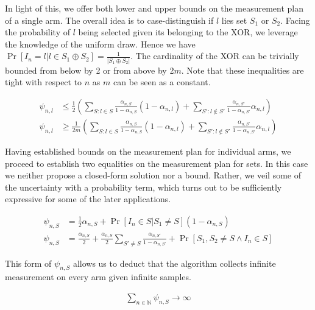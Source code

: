In light of this, we offer both lower and upper bounds on the measurement plan of
a single arm. The overall idea is to case-distinguish if $l$ lies set $S_1$ or
$S_2$. Facing the probability of $l$ being selected given its belonging to the
XOR, we leverage the knowledge of the uniform draw. Hence we have $\Pr[I_n = l|l
\in S_1 \oplus S_2] = \frac{1}{|S_1 \oplus S_2|}$. The cardinality of the XOR
can be trivially bounded from below by 2 or from above by 2$m$. Note that these
inequalities are tight with respect to $n$ as $m$ can be seen as a constant.
\begin{proposition}\label{proposition:measurement_plan_arm}
  \begin{align}
    \psi_{n, l} &\leq \frac{1}{2}(\sum_{S: l \in S} \frac{\alpha_{n, S}}{1 -
        \alpha_{n, S}} (1 - \alpha_{n, l}) +  \sum_{S': l \notin S'}
        \frac{\alpha_{n, S'}}{1 - \alpha_{n, S'}} \alpha_{n, l}) \\
    \psi_{n, l} &\geq \frac{1}{2m}(\sum_{S: l \in S} \frac{\alpha_{n, S}}{1 -
        \alpha_{n, S}} (1 - \alpha_{n, l}) +  \sum_{S': l \notin S'}
        \frac{\alpha_{n, S'}}{1 - \alpha_{n, S'}} \alpha_{n, l})
  \end{align}
\end{proposition}
Having established bounds on the measurement plan for individual arms, we
proceed to establish two equalities on the measurement plan for sets. In this
case we neither propose a closed-form solution nor a bound. Rather, we veil some
of the uncertainty with a probability term, which turns out to be sufficiently
expressive for some of the later applications.
\begin{proposition}\label{proposition:measurement_pan_set}
  \begin{align}
    \psi_{n, S} &= \frac{1}{2} \alpha_{n, S} +  \Pr[I_n \in S | S_1 \neq S] (1 - \alpha_{n, S}) \\
    \psi_{n, S} &= \frac{\alpha_{n, S}}{2} +  \frac{\alpha_{n, S}}{2} \sum_{S'\neq S} \frac{\alpha_{n, S'}}{1 - \alpha_{n, S'}} + \Pr[S_1, S_2 \neq S \wedge I_n \in S]
  \end{align}
\end{proposition}
This form of $\psi_{n, S}$ allows us to deduct that the algorithm collects infinite measurement on every arm given infinite samples.
\begin{lemma}\label{lemma:infinite_measurement}
  \begin{align}
    \sum_{n \in \mathbb{N}} \psi_{n, S} \rightarrow \infty
  \end{align}
\end{lemma}
